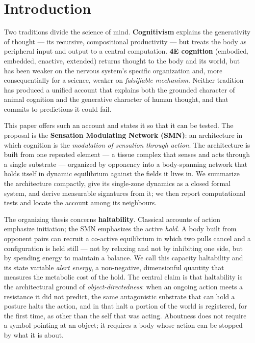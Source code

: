 \documentclass[utf8]{FrontiersinHarvard}
\begin{document}
\section{Introduction}\label{sec:intro}

Two traditions divide the science of mind. \textbf{Cognitivism} explains the generativity of thought --- its recursive, compositional productivity --- but treats the body as peripheral input and output to a central computation. \textbf{4E cognition} (embodied, embedded, enactive, extended) returns thought to the body and its world, but has been weaker on the nervous system's specific organization and, more consequentially for a science, weaker on \emph{falsifiable mechanism}. Neither tradition has produced a unified account that explains both the grounded character of animal cognition and the generative character of human thought, and that commits to predictions it could fail.

This paper offers such an account and states it so that it can be tested. The proposal is the \textbf{Sensation Modulating Network (SMN)}: an architecture in which cognition is the \emph{modulation of sensation through action}. The architecture is built from one repeated element --- a tissue complex that senses and acts through a single substrate --- organized by opponency into a body-spanning network that holds itself in dynamic equilibrium against the fields it lives in. We summarize the architecture compactly, give its single-zone dynamics as a closed formal system, and derive measurable signatures from it; we then report computational tests and locate the account among its neighbours.

The organizing thesis concerns \textbf{haltability}. Classical accounts of action emphasize initiation; the SMN emphasizes the active \emph{hold}. A body built from opponent pairs can recruit a co-active equilibrium in which two pulls cancel and a configuration is held still --- not by relaxing and not by inhibiting one side, but by spending energy to maintain a balance. We call this capacity haltability and its state variable \emph{alert energy}, a non-negative, dimensionful quantity that measures the metabolic cost of the hold. The central claim is that haltability is the architectural ground of \emph{object-directedness}: when an ongoing action meets a resistance it did not predict, the same antagonistic substrate that can hold a posture halts the action, and in that halt a portion of the world is registered, for the first time, as other than the self that was acting. Aboutness does not require a symbol pointing at an object; it requires a body whose action can be stopped by what it is about.
\end{document}

